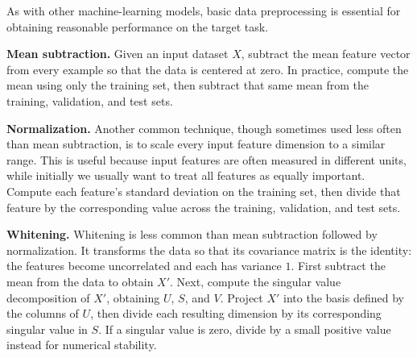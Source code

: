 \documentclass[
  a4paper,
  10pt]{article}
\begin{document}
As with other machine-learning models, basic data preprocessing is
essential for obtaining reasonable performance on the target task.

\textbf{Mean subtraction.} Given an input dataset \(X\), subtract the
mean feature vector from every example so that the data is centered at
zero. In practice, compute the mean using only the training set, then
subtract that same mean from the training, validation, and test sets.

\textbf{Normalization.} Another common technique, though sometimes used
less often than mean subtraction, is to scale every input feature
dimension to a similar range. This is useful because input features are
often measured in different units, while initially we usually want to
treat all features as equally important. Compute each feature's standard
deviation on the training set, then divide that feature by the
corresponding value across the training, validation, and test sets.

\textbf{Whitening.} Whitening is less common than mean subtraction
followed by normalization. It transforms the data so that its covariance
matrix is the identity: the features become uncorrelated and each has
variance \(1\). First subtract the mean from the data to obtain \(X'\).
Next, compute the singular value decomposition of \(X'\), obtaining
\(U\), \(S\), and \(V\). Project \(X'\) into the basis defined by the
columns of \(U\), then divide each resulting dimension by its
corresponding singular value in \(S\). If a singular value is zero,
divide by a small positive value instead for numerical stability.
\end{document}

